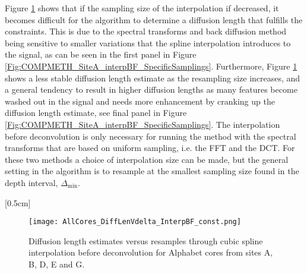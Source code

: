 \documentclass[../../CompleteThesis2/Complete_2ndDraft]{subfiles}
\begin{document}
Figure \ref{Fig:COMPMETH_SamplingVsDiffLen_interpBF} shows that if the sampling size of the interpolation if decreased, it becomes difficult for the algorithm to determine a diffusion length that fulfills the constraints. This is due to the spectral transforms and back diffusion method being sensitive to smaller variations that the spline interpolation introduces to the signal, as can be seen in the first panel in Figure \ref{Fig:COMPMETH_SiteA_interpBF_SpecificSamplings}. Furthermore, Figure \ref{Fig:COMPMETH_SamplingVsDiffLen_interpBF} shows a less stable diffusion length estimate as the resampling size increases, and a general tendency to result in higher diffusion lengths as many features become washed out in the signal and needs more enhancement by cranking up the diffusion length estimate, see final panel in Figure \ref{Fig:COMPMETH_SiteA_interpBF_SpecificSamplings}. The interpolation before deconvolution is only necessary for running the method with the spectral transforms that are based on uniform sampling, i.e. the FFT and the DCT. For these two methods a choice of interpolation size can be made, but the general setting in the algorithm is to resample at the smallest sampling size found in the depth interval, $\Delta_{\text{min}}$.

[0.5cm]%
\begin{figure}[!htb]
	\centering
	\texttt{[image: AllCores\_DiffLenVdelta\_InterpBF\_const.png]}
	\caption[Diffusion length versus resampling size before deconvolution, all cores.]{\small Diffusion length estimates versus resamples through cubic spline interpolation before deconvolution for Alphabet cores from sites A, B, D, E and G.}
	\label{Fig:COMPMETH_SamplingVsDiffLen_interpBF}
\end{figure}
\end{document}
